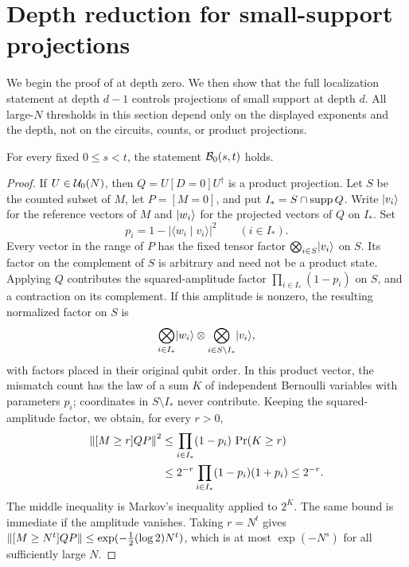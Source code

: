 \section{Depth reduction for small-support projections}
\label{sec:depth}

We begin the proof of  at depth zero. We then
show that the full localization statement at depth $d-1$ controls
projections of small support at depth $d$. All large-$N$ thresholds
in this section depend only on the displayed exponents and the depth,
not on the circuits, counts, or product projections.

\begin{lemma}\label{lem:base}
For every fixed $0\le s<t$, the statement $\mathcal B_0(s,t)$ holds.
\end{lemma}

\begin{proof}
If $U\in\mathcal U_0(N)$, then $Q=U[D=0]U^\dagger$ is a product
projection. Let $S$ be the counted subset of $M$, let
$P=[M=0]$, and put $I_*=S\cap\operatorname{supp} Q$. Write $\lvert v_i\rangle$
for the reference vectors of $M$ and $\lvert w_i\rangle$ for the projected
vectors of $Q$ on $I_*$. Set
\[
 p_i=1-|\langle w_i\mid v_i\rangle|^2\qquad(i\in I_*).
\]
Every vector in the range of $P$ has the fixed tensor factor
$\bigotimes_{i\in S}\lvert v_i\rangle$ on $S$. Its factor on the
complement of $S$ is arbitrary and need not be a product state.
Applying $Q$ contributes the squared-amplitude factor
$\prod_{i\in I_*}(1-p_i)$ on $S$, and a contraction on its
complement. If this amplitude is nonzero, the resulting normalized
factor on $S$ is
\[
 \bigotimes_{i\in I_*}\lvert w_i\rangle\otimes
 \bigotimes_{i\in S\setminus I_*}\lvert v_i\rangle,
\]
with factors placed in their original qubit order. In this product
vector, the mismatch count has the law of a sum $K$ of independent
Bernoulli variables with parameters $p_i$; coordinates in
$S\setminus I_*$ never contribute. Keeping the squared-amplitude
factor, we obtain, for every $r>0$,
\begin{align*}
 \left\lVert [M\ge r]QP\right\rVert^2
 &\le \prod_{i\in I_*}(1-p_i)\,\Pr(K\ge r)\\
 &\le 2^{-r}\prod_{i\in I_*}(1-p_i)(1+p_i)
 \le 2^{-r}.
\end{align*}
The middle inequality is Markov's inequality applied to $2^K$.
The same bound is immediate if the amplitude vanishes. Taking
$r=N^t$ gives
$\left\lVert [M\ge N^t]QP\right\rVert\le\exp(-\tfrac12(\log 2)N^t)$,
which is at most $\exp(-N^s)$ for all sufficiently large $N$.
\end{proof}

